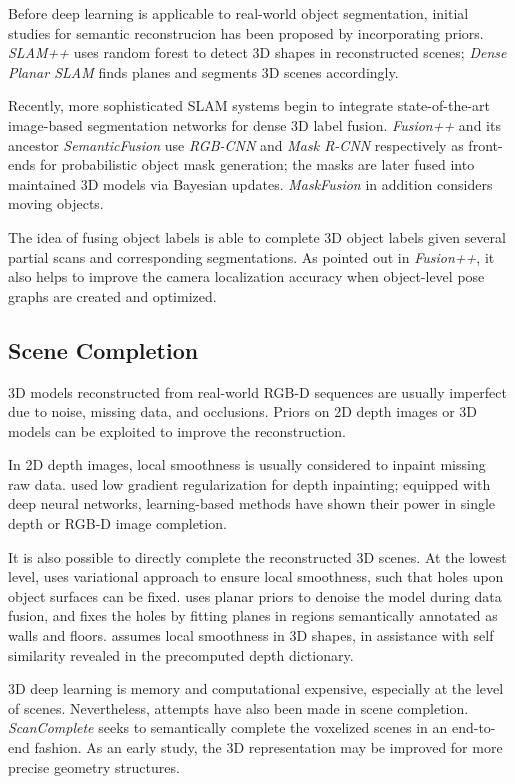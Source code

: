 \documentclass{article}
\begin{document}
Before deep learning is applicable to real-world object
segmentation, initial studies for semantic reconstrucion has been proposed by
incorporating priors. \textit{SLAM++} \cite{Salas-Moreno-et-al-CVPR-2013}
uses random forest to detect 3D shapes in reconstructed scenes;
\textit{Dense Planar SLAM} \cite{Salas-Moreno-et-al-ISMAR-2014} finds
planes and segments 3D scenes accordingly.

Recently, more sophisticated SLAM systems begin to integrate state-of-the-art
image-based segmentation networks for dense 3D label fusion.
\textit{Fusion++} \cite{McCormac-et-al-3DV-2018} and its
ancestor \textit{SemanticFusion}\cite{McCormac-et-al-ICRA-2017} use
\textit{RGB-CNN} and \textit{Mask R-CNN} respectively as front-ends for
probabilistic object mask generation; the masks are later fused into
maintained 3D models via Bayesian
updates. \textit{MaskFusion} \cite{Runz-and-Agapito-ISMAR-2018} in addition
considers moving objects.

The idea of fusing object labels is able to complete 3D object labels given
several partial scans and corresponding segmentations.
As pointed out in \textit{Fusion++}, it also helps to improve
the camera localization accuracy when object-level pose graphs are
created and optimized.

\subsection{Scene Completion}
3D models reconstructed from real-world RGB-D sequences are usually imperfect
due to noise, missing data, and occlusions. Priors on 2D depth images or 3D
models can be exploited to improve the reconstruction.

In 2D depth images, local smoothness is usually considered to inpaint missing
raw data. \cite{Xue-et-al-TIP-2017} used low gradient regularization for
depth inpainting; equipped with deep neural networks, learning-based
methods have shown their power in single depth or RGB-D
image completion\cite{Song-et-al-CVPR-2017,
Zhang-and-Funkhouser-CVPR-2018, Atapour-Abarghouei-and-Breckon-BMVC-2017}.

It is also possible to directly complete the reconstructed 3D scenes. At the
lowest level, \cite{Zach-et-al-ICCV-2007} uses variational approach to
ensure local smoothness, such that holes upon object surfaces can be fixed.
\cite{Dzitsiuk-et-al-ICRA-2017} uses planar priors to denoise the model
during data fusion, and fixes the holes by fitting planes in regions semantically
annotated as walls and floors. \cite{Sahay-and-Rajagopalan-CVPRW-2015}
assumes local smoothness in 3D shapes, in assistance with self
similarity revealed in the precomputed depth dictionary.

3D deep learning is memory and computational expensive, especially at the
level of scenes. Nevertheless, attempts have also been made in scene
completion.
\textit{ScanComplete} \cite{Dai-et-al-CVPR-2018} seeks to semantically complete
the voxelized scenes in an end-to-end fashion. As an early study, the 3D
representation may be improved for more precise geometry structures.



\end{document}
